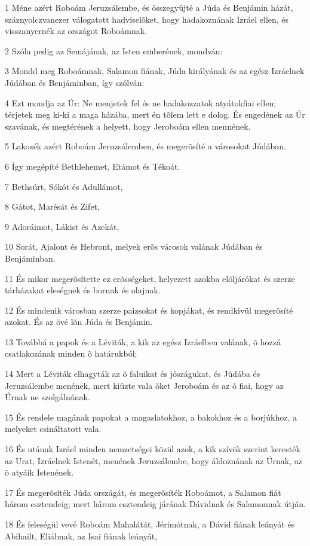 \par 1 Méne azért Roboám Jeruzsálembe, és összegyûjté a Júda és Benjámin házát, száznyolczvanezer válogatott hadviselõket, hogy hadakoznának Izráel ellen, és visszanyernék az országot Roboámnak.
\par 2 Szóla pedig az Semájának, az Isten emberének, mondván:
\par 3 Mondd meg Roboámnak, Salamon fiának, Júda királyának és az egész Izráelnek Júdában és Benjáminban, így szólván:
\par 4 Ezt mondja az Úr: Ne menjetek fel és ne hadakozzatok atyátokfiai ellen; térjetek meg ki-ki a maga házába, mert én tõlem lett e dolog. És engedének az Úr szavának, és megtérének a helyett, hogy Jeroboám ellen mennének.
\par 5 Lakozék azért Roboám Jeruzsálemben, és megerõsíté a városokat Júdában.
\par 6 Így megépíté Bethlehemet, Etámot és Tékoát.
\par 7 Bethsúrt, Sókót és Adullámot,
\par 8 Gátot, Marésát és Zifet,
\par 9 Adoráimot, Lákist és Azekát,
\par 10 Sorát, Ajalont és Hebront, melyek erõs városok valának Júdában és Benjáminban.
\par 11 És mikor megerõsítette ez erõsségeket, helyezett azokba elõljárókat és szerze tárházakat eleségnek és bornak és olajnak.
\par 12 És mindenik városban szerze paizsokat és kopjákat, és rendkivül megerõsíté azokat. És az övé lõn Júda és Benjámin.
\par 13 Továbbá a papok és a Léviták, a kik az egész Izráelben valának, õ hozzá csatlakozának minden õ határukból;
\par 14 Mert a Léviták elhagyták az õ faluikat és jószágukat, és Júdába és Jeruzsálembe menének, mert kiûzte vala õket Jeroboám és az õ fiai, hogy az Úrnak ne szolgálnának.
\par 15 És rendele magának papokat a magaslatokhoz, a bakokhoz és a borjúkhoz, a melyeket csináltatott vala.
\par 16 És utánuk Izráel minden nemzetségei közül azok, a kik szívök szerint keresték az Urat, Izráelnek Istenét, menének Jeruzsálembe, hogy áldoznának az Úrnak, az õ atyáik Istenének.
\par 17 És megerõsíték Júda országát, és megerõsíték Roboámot, a Salamon fiát három esztendeig; mert három esztendeig járának Dávidnak és Salamonnak útján.
\par 18 És feleségül vevé Roboám Mahalátát, Jérimótnak, a Dávid fiának leányát és Abihailt, Eliábnak, az Isai fiának leányát,
